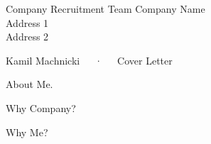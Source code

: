 




\recipient
  {Company Recruitment Team}
  {Company Name\\Address 1\\Address 2}



\makecvheader[R]

\makecvfooter
  {}%
  {Kamil Machnicki~~~·~~~Cover Letter}
  {}

\makelettertitle

\begin{cvletter}

About Me.

Why Company?

Why Me?

\end{cvletter}

\makeletterclosing


